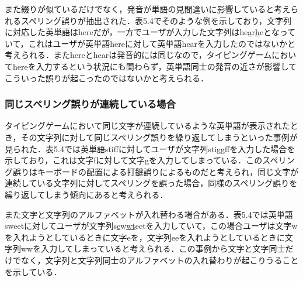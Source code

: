 また綴りが似ているだけでなく，発音が単語の見間違いに影響していると考えられるスペリング誤りが抽出された．表5.4でそのような例を示しており，文字列に対応した英単語はhereだが，一方でユーザが入力した文字列はhe\underline{a}r\underline{h}eとなっていて，これはユーザが英単語hereに対して英単語hearを入力したのではないかと考えられる．またhereとhearは発音的には同じなので，タイピングゲームにおいてhereを入力するという状況にも関わらず，英単語同士の発音の近さが影響してこういった誤りが起こったのではないかと考えられる．

\subsubsection{同じスペリング誤りが連続している場合}
タイピングゲームにおいて同じ文字が連続しているような英単語が表示されたとき，その文字列に対して同じスペリング誤りを繰り返してしまうといった事例が見られた．表5.4では英単語stiffに対してユーザが文字列sti\underline{gg}ffを入力した場合を示しており，これは文字fに対して文字gを入力してしまっている．このスペリング誤りはキーボードの配置による打鍵誤りによるものだと考えられ，同じ文字が連続している文字列に対してスペリングを誤った場合，同様のスペリング誤りを繰り返してしまう傾向にあると考えられる．

また文字と文字列のアルファベットが入れ替わる場合がある．表5.4では英単語sweetに対してユーザが文字列s\underline{e}w\underline{wt}eetを入力していて，この場合ユーザは文字wを入れようとしているときに文字eを，文字列eeを入れようとしているときに文字列wwを入力してしまっていると考えられる．この事例から文字と文字同士だけでなく，文字列と文字列同士のアルファベットの入れ替わりが起こりうることを示している．

